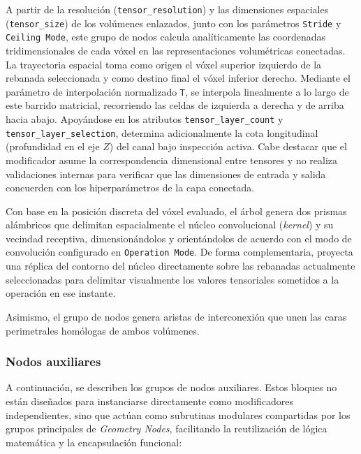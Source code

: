 A partir de la resolución (\texttt{tensor\_resolution}) y las dimensiones espaciales (\texttt{tensor\_size}) de los volúmenes enlazados, junto con los parámetros 
\texttt{Stride} y \texttt{Ceiling Mode}, este grupo de nodos calcula analíticamente las coordenadas tridimensionales de cada vóxel en las representaciones 
volumétricas conectadas. La trayectoria espacial toma como origen el vóxel superior izquierdo de la rebanada seleccionada y como destino final el vóxel inferior 
derecho. Mediante el parámetro de interpolación normalizado \texttt{T}, se interpola linealmente a lo largo de este barrido matricial, recorriendo las celdas 
de izquierda a derecha y de arriba hacia abajo. Apoyándose en los atributos \texttt{tensor\_layer\_count} y \texttt{tensor\_layer\_selection}, determina 
adicionalmente la cota longitudinal (profundidad en el eje $Z$) del canal bajo inspección activa. Cabe destacar que el modificador asume la correspondencia 
dimensional entre tensores y no realiza validaciones internas para verificar que las dimensiones de entrada y salida concuerden con los hiperparámetros de la capa conectada.
\medskip

Con base en la posición discreta del vóxel evaluado, el árbol genera dos prismas alámbricos que delimitan espacialmente el núcleo convolucional 
(\textit{kernel}) y su vecindad receptiva, dimensionándolos y orientándolos de acuerdo con el modo de convolución configurado en \texttt{Operation Mode}. 
De forma complementaria, proyecta una réplica del contorno del núcleo directamente sobre las rebanadas actualmente seleccionadas para delimitar visualmente 
los valores tensoriales sometidos a la operación en ese instante.
\medskip

Asimismo, el grupo de nodos genera aristas de interconexión que unen las caras perimetrales homólogas de ambos volúmenes.

\subsubsection{Nodos auxiliares}
A continuación, se describen los grupos de nodos auxiliares. Estos bloques no están diseñados para instanciarse directamente como modificadores independientes, 
sino que actúan como subrutinas modulares compartidas por los grupos principales de \textit{Geometry Nodes}, facilitando la reutilización de lógica matemática 
y la encapsulación funcional:

